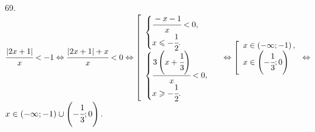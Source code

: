 69. $\cfrac{|2x+1|}{x}<-1\Leftrightarrow\cfrac{|2x+1|+x}{x}<0\Leftrightarrow
\left[\begin{array}{l}\begin{cases}\cfrac{-x-1}{x}<0,\\ x\leqslant-\cfrac{1}{2}.\end{cases}\\ \begin{cases}\cfrac{3\left(x+\cfrac{1}{3}\right)}{x}<0,\\ x\geqslant-\cfrac{1}{2}.\end{cases}  \end{array}\right.\Leftrightarrow\left[\begin{array}{l} x\in\left(-\infty;-1\right),\\
x\in\left(-\cfrac{1}{3};0\right)\end{array}\right.\Leftrightarrow$\\$ x\in\left(-\infty;-1\right)\cup\left(-\cfrac{1}{3};0\right).$\\
